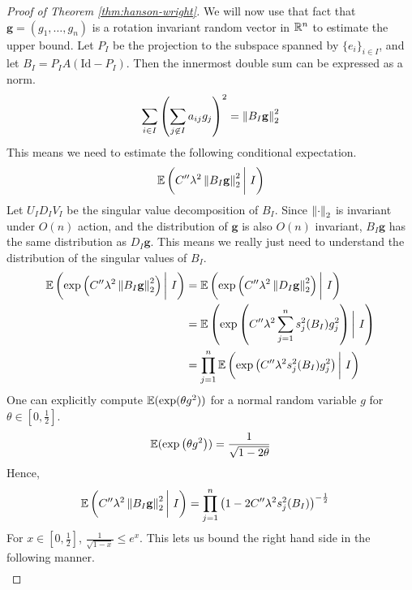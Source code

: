 \documentclass[11pt]{article}
\begin{document}
\begin{proof}[Proof of Theorem \ref{thm:hanson-wright}]
  We will now use that fact that $\mathbf{g} = (g_1, \ldots, g_n)$ is a rotation invariant random vector in $\mathbb{R}^n$ to estimate the upper bound.
  Let $P_{I}$ be the projection to the subspace spanned by $\{e_i\}_{i \in I}$, and let $B_I = P_{I}A(\mathrm{Id} - P_I)$.
  Then the innermost double sum can be expressed as a norm.
  \begin{align*}
    \sum_{i \in I} \left( \sum_{j \not \in I} a_{ij} g_j \right)^2 = \left\lVert B_I \mathbf{g}\right\rVert_2^2
  \end{align*}
  This means we need to estimate the following conditional expectation.
  \begin{align*}
    \mathbb{E}\left( C^{\prime \prime} \lambda^2 \left\lVert B_I \mathbf{g}\right\rVert_2^2 \bigg|\ I \right)
  \end{align*}
  Let $U_ID_IV_I$ be the singular value decomposition of $B_I$.
  Since $\left\lVert\cdot\right\rVert_2$ is invariant under $O(n)$ action, and the distribution of $\mathbf{g}$ is also $O(n)$ invariant, $B_I \mathbf{g}$ has the same distribution as $D_I \mathbf{g}$.
  This means we really just need to understand the distribution of the singular values of $B_I$.
  \begin{align*}
    \mathbb{E}\left( \exp\left(   C^{\prime \prime} \lambda^2 \left\lVert B_I \mathbf{g}\right\rVert_2^2 \right) \bigg|\ I \right)
    &= \mathbb{E}\left( \exp\left( C^{\prime \prime} \lambda^2 \left\lVert D_I \mathbf{g}\right\rVert_2^2 \right)  \bigg|\ I \right) \\
    &= \mathbb{E}\left( \exp\left(  C^{\prime \prime} \lambda^2 \sum_{j=1}^n s_j^2(B_I) g_j^2 \right)  \bigg|\ I \right) \\
    &= \prod_{j=1}^n \mathbb{E}\left( \exp\left( C^{\prime \prime} \lambda^2 s_j^2(B_I) g_j^2 \right) \bigg|\ I \right)
  \end{align*}
  One can explicitly compute $\mathbb{E}(\exp(\theta g^2))$ for a normal random variable $g$ for $\theta \in \left[ 0, \frac{1}{2} \right]$.
  \begin{align*}
    \mathbb{E}(\exp\left( \theta g^2 \right)) = \frac{1}{\sqrt{1 - 2\theta}}
  \end{align*}
  Hence,
  \begin{align*}
    \mathbb{E}\left( C^{\prime \prime} \lambda^2 \left\lVert B_I \mathbf{g}\right\rVert_2^2 \bigg|\ I \right)
    &= \prod_{j=1}^n \left( 1 - 2 C^{\prime \prime} \lambda^2 s_j^2(B_I) \right)^{-\frac{1}{2}}
  \end{align*}
  For $x \in \left[ 0 , \frac{1}{2} \right]$, $\frac{1}{\sqrt{1-x}} \leq e^x$. This lets us bound the right hand side in the following manner.
  \begin{align*}

\end{align*}
\end{proof}
\end{document}
